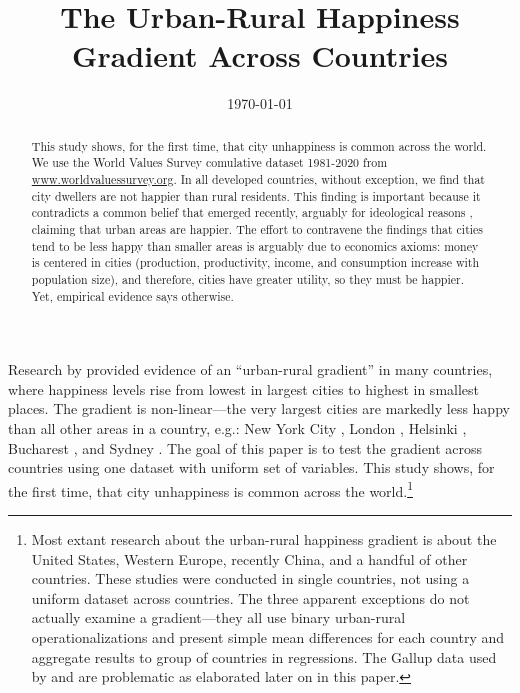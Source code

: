 \documentclass[10pt, letterpaper]{article}
\date{{}\today  \hspace{.2in}\xxivtime}
\title{  %
The Urban-Rural Happiness Gradient Across Countries%
}
\author{
}
\begin{document}


\maketitle
\vspace{-.4in}
\begin{center}

\end{center}


\begin{abstract}
\noindent This study shows, for the first time, that city unhappiness is 
common across the world. We use the World Values Survey comulative dataset
1981-2020 from \url{www.worldvaluessurvey.org}. 
In all developed countries, %
 without exception, we find that city dwellers are not happier than rural
residents. This finding is important because it contradicts a common belief that
emerged recently, arguably for ideological reasons \citep[e.g.,][]{glaeser11,glaeser14,burger20}, claiming that urban areas are happier. The effort to contravene the findings that cities tend to be less happy than smaller areas is arguably due to economics axioms: money is centered in cities (production, productivity, income, and consumption increase with population size), and therefore, cities have greater utility, so they must be happier. Yet, empirical evidence says otherwise. 
\end{abstract}
\vspace{.15in} 
\noindent{\sc %
}
\vspace{.25in} 

Research by \cite{aok11a} provided evidence of an ``urban-rural gradient'' in many countries, where happiness levels rise from lowest in largest cities to highest in smallest places. The gradient is non-linear---the very largest cities are markedly less happy than all other areas in a country, e.g.: New York City \citep{aok_brfss_city_cize16,senior_ny_sep16_14}, London \citep{ons11,ibt13}, Helsinki \citep{morrison15}, Bucharest \citep{lenzi16D}, and Sydney \citep[cited in][]{morrison11}.
The goal of this paper is to test the gradient across countries using one dataset with uniform set of variables. This study shows, for the first time, that city unhappiness is common across the world.\footnote{Most extant research about the urban-rural happiness gradient is about the United States, Western Europe, recently China, and a handful of other countries. These studies were conducted in single countries, not using a uniform dataset across countries. The three apparent exceptions \citep{aokcities,burger20,easterlin10al} do not actually examine a gradient---they all use binary urban-rural operationalizations and present simple mean differences for each country and aggregate results to group of countries in regressions. The Gallup data used by \citet{burger20} and \citet{easterlin10al} are problematic as elaborated later on in this paper.}
 
\end{document}
